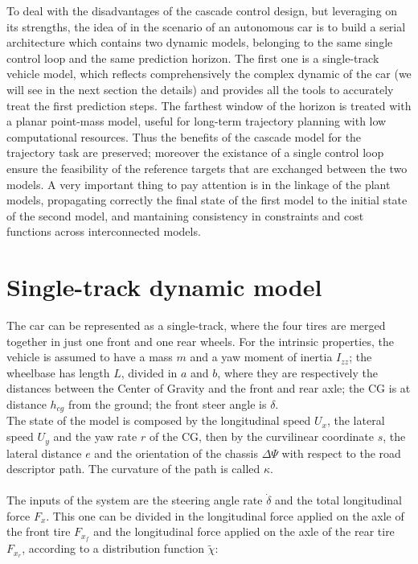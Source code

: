 \documentclass[a4paper, onecolumn, 11pt, twoside]{article}
\begin{document}
To deal with the disadvantages of the cascade control design, but leveraging on its 
strengths, the idea of \cite{paper} in the scenario of an autonomous car is to build 
a serial architecture which contains two dynamic models, belonging to the same single
control loop and the same prediction horizon. The first one is a single-track vehicle
model, which reflects comprehensively the complex dynamic of the car (we will see in the 
next section the details) and provides all the tools to accurately treat the first
prediction steps. The farthest window of the horizon is treated with a planar point-mass 
model, useful for long-term trajectory planning with low computational resources.
Thus the benefits of the cascade model for the trajectory task are preserved; moreover
the existance of a single control loop ensure the feasibility of the reference targets
that are exchanged between the two models. A very important thing to pay attention is 
in the linkage of the plant models, propagating correctly the final state of the first
model to the initial state of the second model, and mantaining consistency in constraints
and cost functions across interconnected models.


\section*{Single-track dynamic model}
The car can be represented as a single-track, where the four tires are merged together in
just one front and one rear wheels.
For the intrinsic properties, the vehicle is assumed to have a mass $m$ and a yaw moment of
inertia $I_{zz}$; the wheelbase has length $L$, divided in $a$ and $b$, where they are respectively
the distances between the Center of Gravity and the front and rear axle; the CG is at distance 
$h_{cg}$ from the ground; the front steer angle is $\delta$. \\
The state of the model
is composed by the longitudinal speed $U_x$, the lateral speed $U_y$ and the yaw rate $r$ of
the CG, then by the curvilinear coordinate $s$, the lateral distance $e$ and the orientation 
of the chassis $\Delta \varPsi$ with respect to the road descriptor path. The curvature of the path
is called $\kappa$. \\
\\
The inputs of the system are the steering angle rate $\dot{\delta}$ and the total longitudinal 
force $F_x$. This one can be divided in the longitudinal force applied on the axle of the front 
tire $F_{x_f}$ and the longitudinal force applied on the axle of the rear tire $F_{x_r}$,
according to a distribution function $\tilde{\chi}$:
\end{document}
